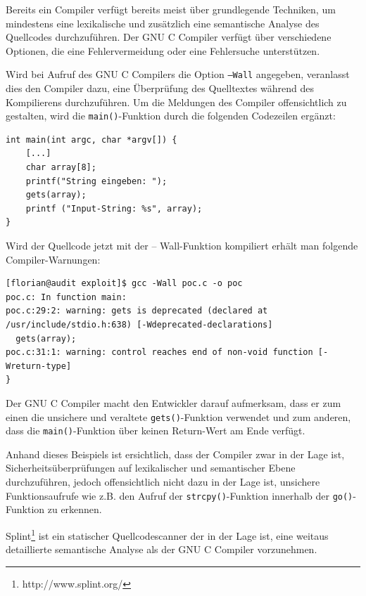 Bereits ein Compiler verfügt bereits meist über grundlegende Techniken, 
um mindestens eine lexikalische und zusätzlich eine semantische Analyse 
des Quellcodes durchzuführen. Der GNU C Compiler verfügt über verschiedene 
Optionen, die eine Fehlervermeidung oder eine Fehlersuche unterstützen.

Wird bei Aufruf des GNU C Compilers die Option \texttt{–Wall} angegeben, 
veranlasst dies den Compiler dazu, eine Überprüfung des Quelltextes 
während des Kompilierens durchzuführen. Um die Meldungen des Compiler 
offensichtlich zu gestalten, wird die \texttt{main()}-Funktion durch 
die folgenden Codezeilen ergänzt:

\begin{lstlisting}[basicstyle=\ttfamily\footnotesize]
int main(int argc, char *argv[]) {
    [...]
    char array[8];
    printf("String eingeben: ");
    gets(array);
    printf ("Input-String: %s", array);
}
\end{lstlisting}

Wird der Quellcode jetzt mit der – Wall-Funktion kompiliert erhält man 
folgende Compiler-Warnungen:

\begin{lstlisting}[basicstyle=\ttfamily\footnotesize]
[florian@audit exploit]$ gcc -Wall poc.c -o poc
poc.c: In function main:
poc.c:29:2: warning: gets is deprecated (declared at /usr/include/stdio.h:638) [-Wdeprecated-declarations]
  gets(array);
poc.c:31:1: warning: control reaches end of non-void function [-Wreturn-type]
}
\end{lstlisting}

Der GNU C Compiler macht den Entwickler darauf aufmerksam, dass er zum 
einen die unsichere und veraltete \texttt{gets()}-Funktion verwendet und 
zum anderen, dass die \texttt{main()}-Funktion über keinen Return-Wert am 
Ende verfügt.

Anhand dieses Beispiels ist ersichtlich, dass der Compiler zwar in der 
Lage ist, Sicherheitsüberprüfungen auf lexikalischer und semantischer 
Ebene durchzuführen, jedoch offensichtlich nicht dazu in der Lage ist, 
unsichere Funktionsaufrufe wie z.B. den Aufruf der \texttt{strcpy()}-Funktion 
innerhalb der \texttt{go()}-Funktion zu erkennen.


Splint\footnote{http://www.splint.org/} ist ein statischer Quellcodescanner 
der in der Lage ist, eine weitaus detaillierte semantische Analyse als 
der GNU C Compiler vorzunehmen.

